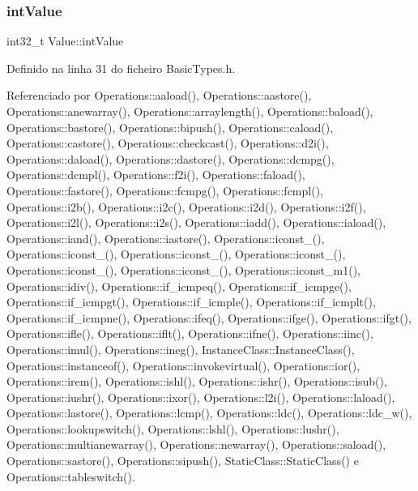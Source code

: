 \subsubsection{\texorpdfstring{int\+Value}{intValue}}
{\footnotesize\ttfamily int32\+\_\+t Value\+::int\+Value}



Definido na linha 31 do ficheiro Basic\+Types.\+h.



Referenciado por Operations\+::aaload(), Operations\+::aastore(), Operations\+::anewarray(), Operations\+::arraylength(), Operations\+::baload(), Operations\+::bastore(), Operations\+::bipush(), Operations\+::caload(), Operations\+::castore(), Operations\+::checkcast(), Operations\+::d2i(), Operations\+::daload(), Operations\+::dastore(), Operations\+::dcmpg(), Operations\+::dcmpl(), Operations\+::f2i(), Operations\+::faload(), Operations\+::fastore(), Operations\+::fcmpg(), Operations\+::fcmpl(), Operations\+::i2b(), Operations\+::i2c(), Operations\+::i2d(), Operations\+::i2f(), Operations\+::i2l(), Operations\+::i2s(), Operations\+::iadd(), Operations\+::iaload(), Operations\+::iand(), Operations\+::iastore(), Operations\+::iconst\+\_(), Operations\+::iconst\+\_(), Operations\+::iconst\+\_(), Operations\+::iconst\+\_(), Operations\+::iconst\+\_(), Operations\+::iconst\+\_(), Operations\+::iconst\+\_\+m1(), Operations\+::idiv(), Operations\+::if\+\_\+icmpeq(), Operations\+::if\+\_\+icmpge(), Operations\+::if\+\_\+icmpgt(), Operations\+::if\+\_\+icmple(), Operations\+::if\+\_\+icmplt(), Operations\+::if\+\_\+icmpne(), Operations\+::ifeq(), Operations\+::ifge(), Operations\+::ifgt(), Operations\+::ifle(), Operations\+::iflt(), Operations\+::ifne(), Operations\+::iinc(), Operations\+::imul(), Operations\+::ineg(), Instance\+Class\+::\+Instance\+Class(), Operations\+::instanceof(), Operations\+::invokevirtual(), Operations\+::ior(), Operations\+::irem(), Operations\+::ishl(), Operations\+::ishr(), Operations\+::isub(), Operations\+::iushr(), Operations\+::ixor(), Operations\+::l2i(), Operations\+::laload(), Operations\+::lastore(), Operations\+::lcmp(), Operations\+::ldc(), Operations\+::ldc\+\_\+w(), Operations\+::lookupswitch(), Operations\+::lshl(), Operations\+::lushr(), Operations\+::multianewarray(), Operations\+::newarray(), Operations\+::saload(), Operations\+::sastore(), Operations\+::sipush(), Static\+Class\+::\+Static\+Class() e Operations\+::tableswitch().

\mbox{\label{structValue_a91024026ad1f8f7221fa84f5a44a3d6c}} 
